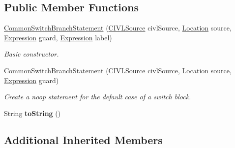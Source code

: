 \subsection*{Public Member Functions}
\begin{DoxyCompactItemize}
\item 
\hyperlink{classedu_1_1udel_1_1cis_1_1vsl_1_1civl_1_1model_1_1common_1_1statement_1_1CommonSwitchBranchStatement_ac734540a720b3da845c8ecef147a01f3}{Common\+Switch\+Branch\+Statement} (\hyperlink{interfaceedu_1_1udel_1_1cis_1_1vsl_1_1civl_1_1model_1_1IF_1_1CIVLSource}{C\+I\+V\+L\+Source} civl\+Source, \hyperlink{interfaceedu_1_1udel_1_1cis_1_1vsl_1_1civl_1_1model_1_1IF_1_1location_1_1Location}{Location} source, \hyperlink{interfaceedu_1_1udel_1_1cis_1_1vsl_1_1civl_1_1model_1_1IF_1_1expression_1_1Expression}{Expression} guard, \hyperlink{interfaceedu_1_1udel_1_1cis_1_1vsl_1_1civl_1_1model_1_1IF_1_1expression_1_1Expression}{Expression} label)
\begin{DoxyCompactList}\small\item\em Basic constructor. \end{DoxyCompactList}\item 
\hyperlink{classedu_1_1udel_1_1cis_1_1vsl_1_1civl_1_1model_1_1common_1_1statement_1_1CommonSwitchBranchStatement_aadda91212ce449c7b58b1481aa2ecef1}{Common\+Switch\+Branch\+Statement} (\hyperlink{interfaceedu_1_1udel_1_1cis_1_1vsl_1_1civl_1_1model_1_1IF_1_1CIVLSource}{C\+I\+V\+L\+Source} civl\+Source, \hyperlink{interfaceedu_1_1udel_1_1cis_1_1vsl_1_1civl_1_1model_1_1IF_1_1location_1_1Location}{Location} source, \hyperlink{interfaceedu_1_1udel_1_1cis_1_1vsl_1_1civl_1_1model_1_1IF_1_1expression_1_1Expression}{Expression} guard)
\begin{DoxyCompactList}\small\item\em Create a noop statement for the default case of a switch block. \end{DoxyCompactList}\item 
\hypertarget{classedu_1_1udel_1_1cis_1_1vsl_1_1civl_1_1model_1_1common_1_1statement_1_1CommonSwitchBranchStatement_a4b57277e44ede73f111f53a00ca35835}{}String {\bfseries to\+String} ()\label{classedu_1_1udel_1_1cis_1_1vsl_1_1civl_1_1model_1_1common_1_1statement_1_1CommonSwitchBranchStatement_a4b57277e44ede73f111f53a00ca35835}

\end{DoxyCompactItemize}
\subsection*{Additional Inherited Members}



